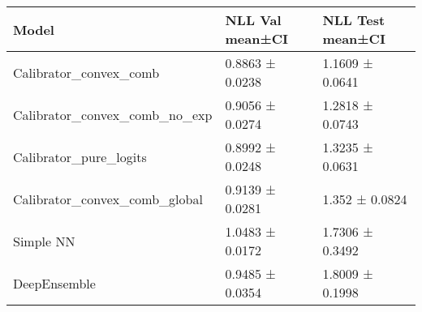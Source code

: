 \begin{tabular}{lll}
\toprule
Model & NLL Val mean±CI & NLL Test mean±CI \\
\midrule
Calibrator_convex_comb & 0.8863 ± 0.0238 & 1.1609 ± 0.0641 \\
Calibrator_convex_comb_no_exp & 0.9056 ± 0.0274 & 1.2818 ± 0.0743 \\
Calibrator_pure_logits & 0.8992 ± 0.0248 & 1.3235 ± 0.0631 \\
Calibrator_convex_comb_global & 0.9139 ± 0.0281 & 1.352 ± 0.0824 \\
Simple NN & 1.0483 ± 0.0172 & 1.7306 ± 0.3492 \\
DeepEnsemble & 0.9485 ± 0.0354 & 1.8009 ± 0.1998 \\
\bottomrule
\end{tabular}
